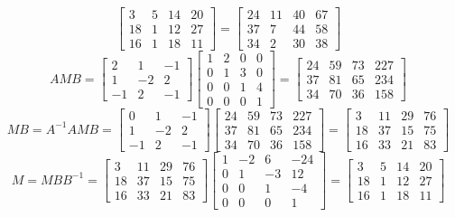 \begin{example}[رمزنگاری]
\[	\begin{bmatrix}
		3 & 5 & 14 & 20 \\
		18 & 1 & 12 & 27 \\
		16 & 1 & 18 & 11
	\end{bmatrix}
	=
	\begin{bmatrix}
		24 & 11 & 40 & 67 \\
		37 & 7 & 44 & 58 \\
		34 & 2 & 30 & 38
	\end{bmatrix}
	\]
	\[
	AMB=
	\begin{bmatrix}
		2 & 1 & -1 \\
		1 & -2 & 2 \\
		-1 & 2 & -1
	\end{bmatrix}
	\begin{bmatrix}
		1 & 2 & 0 & 0 \\
		0 & 1 & 3 & 0 \\
		0 & 0 & 1 & 4 \\
		0 & 0 & 0 & 1
	\end{bmatrix}
	=
	\begin{bmatrix}
		24 & 59 & 73 & 227 \\
		37 & 81 & 65 & 234 \\
		34 & 70 & 36 & 158
	\end{bmatrix}
	\]
	\[
	MB=A^{-1}AMB=
	\begin{bmatrix}
		0 & 1 & -1 \\
		1 & -2 & 2 \\
		-1 & 2 & -1
	\end{bmatrix}
	\begin{bmatrix}
		24 & 59 & 73 & 227 \\
		37 & 81 & 65 & 234 \\
		34 & 70 & 36 & 158
	\end{bmatrix}
	=
	\begin{bmatrix}
		3 & 11 & 29 & 76 \\
		18 & 37 & 15 & 75 \\
		16 & 33 & 21 & 83
	\end{bmatrix}
	\]
	\[
	M=MBB^{-1}=
	\begin{bmatrix}
		3 & 11 & 29 & 76 \\
		18 & 37 & 15 & 75 \\
		16 & 33 & 21 & 83
	\end{bmatrix}
	\begin{bmatrix}
		1 & -2 & 6 & -24 \\
		0 & 1 & -3 & 12 \\
		0 & 0 & 1 & -4 \\
		0 & 0 & 0 & 1
	\end{bmatrix}
	=
	\begin{bmatrix}
		3 & 5 & 14 & 20 \\
		18 & 1 & 12 & 27 \\
		16 & 1 & 18 & 11
	\end{bmatrix}
	\]
\end{example}

